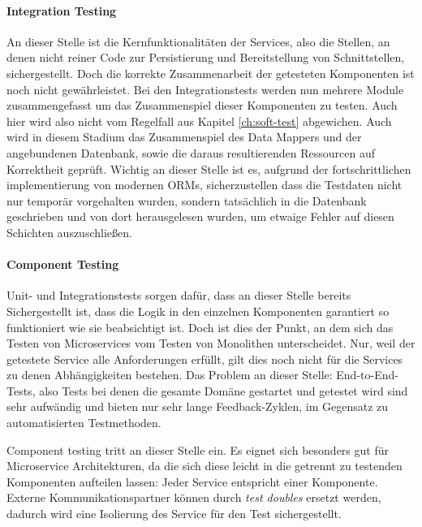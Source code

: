 \documentclass[12pt,a4paper,bibliography=totocnumbered,listof=totocnumbered]{scrartcl}
\begin{document}

\paragraph{Integration Testing}

An dieser Stelle ist die Kernfunktionalitäten der Services, also die Stellen, an denen nicht reiner Code zur Persistierung und Bereitstellung von Schnittstellen, sichergestellt. Doch die korrekte Zusammenarbeit der getesteten Komponenten ist noch nicht gewährleistet. Bei den Integrationstests werden nun mehrere Module zusammengefasst um das Zusammenspiel dieser Komponenten zu testen.\cite{clemson} Auch hier wird also nicht vom Regelfall aus Kapitel \ref{ch:soft-test} abgewichen. Auch wird in diesem Stadium das Zusammenspiel des Data Mappers und der angebundenen Datenbank, sowie die daraus resultierenden Ressourcen auf Korrektheit geprüft. Wichtig an dieser Stelle ist es, aufgrund der fortschrittlichen implementierung von modernen \acp{ORM}, sicherzustellen dass die Testdaten nicht nur temporär vorgehalten wurden, sondern tatsächlich in die Datenbank geschrieben und von dort herausgelesen wurden, um etwaige Fehler auf diesen Schichten auszuschließen.\cite{clemson}


\paragraph{Component Testing}

Unit- und Integrationstests sorgen dafür, dass an dieser Stelle bereits Sichergestellt ist, dass die Logik in den einzelnen Komponenten garantiert so funktioniert wie sie beabsichtigt ist. Doch ist dies der Punkt, an dem sich das Testen von Microservices vom Testen von Monolithen unterscheidet. Nur, weil der getestete Service alle Anforderungen erfüllt, gilt dies noch nicht für die Services zu denen Abhängigkeiten bestehen.
Das Problem an dieser Stelle: End-to-End-Tests, also Tests bei denen die gesamte Domäne gestartet und getestet wird sind sehr aufwändig und bieten nur sehr lange Feedback-Zyklen, im Gegensatz zu automatisierten Testmethoden.\cite{clemson}

Component testing tritt an dieser Stelle ein. Es eignet sich besonders gut für Microservice Architekturen, da die sich diese leicht in die getrennt zu testenden Komponenten aufteilen lassen: Jeder Service entspricht einer Komponente. Externe Kommunikationspartner können durch \textit{test doubles} ersetzt werden, dadurch wird eine Isolierung des Service für den Test sichergestellt.\cite{clemson}
\end{document}
